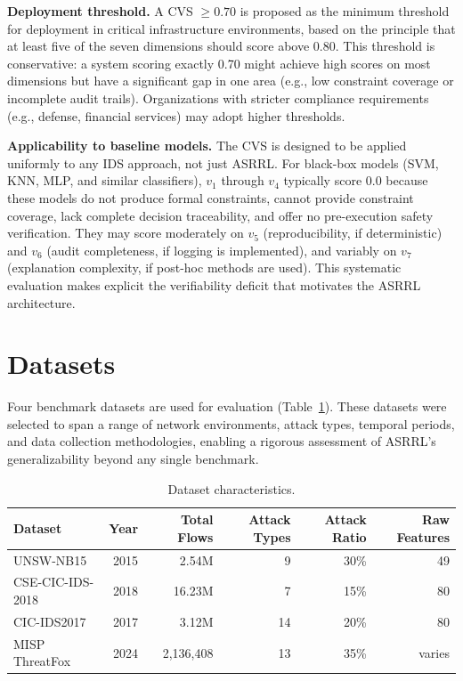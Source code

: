 \documentclass[12pt, letterpaper, oneside]{report}
\newcommand{\ASRRL}{\textsc{ASRRL}}
\begin{document}
\textbf{Deployment threshold.} A CVS $\geq 0.70$ is proposed as the minimum threshold for deployment in critical infrastructure environments, based on the principle that at least five of the seven dimensions should score above 0.80. This threshold is conservative: a system scoring exactly 0.70 might achieve high scores on most dimensions but have a significant gap in one area (e.g., low constraint coverage or incomplete audit trails). Organizations with stricter compliance requirements (e.g., defense, financial services) may adopt higher thresholds.

\textbf{Applicability to baseline models.} The CVS is designed to be applied uniformly to any IDS approach, not just \ASRRL{}. For black-box models (SVM, KNN, MLP, and similar classifiers), $v_1$ through $v_4$ typically score 0.0 because these models do not produce formal constraints, cannot provide constraint coverage, lack complete decision traceability, and offer no pre-execution safety verification. They may score moderately on $v_5$ (reproducibility, if deterministic) and $v_6$ (audit completeness, if logging is implemented), and variably on $v_7$ (explanation complexity, if post-hoc methods are used). This systematic evaluation makes explicit the verifiability deficit that motivates the \ASRRL{} architecture.


\section{Datasets}
\label{sec:datasets}

Four benchmark datasets are used for evaluation (Table~\ref{tab:datasets}). These datasets were selected to span a range of network environments, attack types, temporal periods, and data collection methodologies, enabling a rigorous assessment of \ASRRL{}'s generalizability beyond any single benchmark.

\begin{table}[htbp]
\centering
\caption{Dataset characteristics.}
\label{tab:datasets}
\small
\begin{tabular}{lrrrrr}
\toprule
\textbf{Dataset} & \textbf{Year} & \textbf{Total Flows} & \textbf{Attack Types} & \textbf{Attack Ratio} & \textbf{Raw Features} \\
\midrule
UNSW-NB15 & 2015 & 2.54M & 9 & 30\% & 49 \\
CSE-CIC-IDS-2018 & 2018 & 16.23M & 7 & 15\% & 80 \\
CIC-IDS2017 & 2017 & 3.12M & 14 & 20\% & 80 \\
MISP ThreatFox & 2024 & 2,136,408 & 13 & 35\% & varies \\
\bottomrule
\end{tabular}
\end{table}
\end{document}
